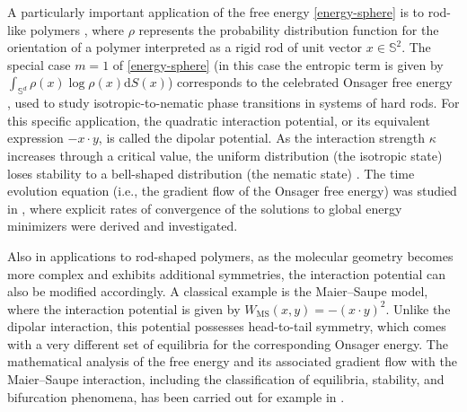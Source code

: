 \documentclass[11pt]{amsart}
\newcommand{\bbs}{\mathbb S}
\newcommand{\dx}{\mathrm{d}S (x)}
\newcommand{\dm}{d} %
\begin{document}
A particularly important application of the free energy \eqref{energy-sphere} is to rod-like polymers \cite{ConstantinKevrekidisTiti2004, fatkullin2005critical}, where $\rho$ represents the probability distribution function for the orientation of a polymer interpreted as a rigid rod of unit vector $x \in \bbs^2$. The special case $m=1$ of \eqref{energy-sphere} (in this case the entropic term is given by $\int_{\bbs^\dm} \rho(x) \log \rho(x) \dx$) corresponds to the celebrated Onsager free energy  \cite{Onsager1949}, used to study isotropic-to-nematic phase transitions in systems of hard rods. For this  specific application, the quadratic interaction potential, or its equivalent expression $- x \cdot y $, is called the dipolar potential. As the interaction strength $\kappa$ increases through a critical value, the uniform distribution (the isotropic state) loses stability to a bell-shaped distribution (the nematic state) \cite{DegondFrouvelleLiu2014, fatkullin2005critical, FrouvelleLiu2012}. The time evolution equation (i.e., the gradient flow of the Onsager free energy) was studied in \cite{FrouvelleLiu2012}, where explicit rates of convergence of the solutions to global energy minimizers were derived and investigated.

Also in applications to rod-shaped polymers, as the molecular geometry becomes more complex and exhibits additional symmetries, the interaction potential can also be modified accordingly. A classical example is the Maier--Saupe model, where the interaction potential is given by $W_{\mathrm{MS}}(x,y)=-(x\cdot y)^2$. Unlike the dipolar interaction, this potential possesses head-to-tail symmetry, which comes with a very different set of equilibria for the corresponding Onsager energy. The mathematical analysis of the free energy and its associated gradient flow with the Maier--Saupe interaction, including the classification of equilibria, stability, and bifurcation phenomena, has been carried out for example in \cite{ball2021axisymmetry, fatkullin2005critical, liu2005axial, zhou2007characterization}.
 
\end{document}
